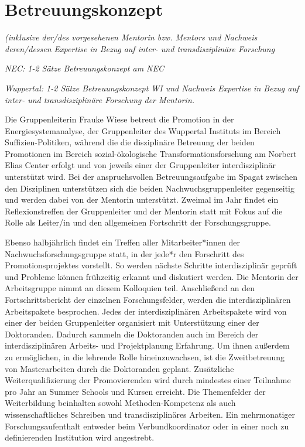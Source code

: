 \documentclass[a4paper,11pt,twoside]{scrartcl}
\begin{document}
\section{Betreuungskonzept}
\textit{(inklusive der/des vorgesehenen Mentorin bzw. Mentors und Nachweis deren/dessen Expertise in Bezug auf inter- und transdisziplinäre Forschung}

\textit{NEC: 1-2 Sätze Betreuungskonzept am NEC}

\textit{Wuppertal: 1-2 Sätze Betreuungskonzept WI und Nachweis Expertise in Bezug auf inter- und transdisziplinäre Forschung der Mentorin.}

Die Gruppenleiterin Frauke Wiese betreut die Promotion in der Energiesystemanalyse, der Gruppenleiter des Wuppertal Instituts im Bereich Suffizien-Politiken, während die die disziplinäre Betreuung der beiden Promotionen im Bereich sozial-ökologische Transformationsforschung am Norbert Elias Center erfolgt und von jeweils einer der Gruppenleiter interdisziplinär unterstützt wird. Bei der anspruchsvollen Betreuungsaufgabe im Spagat zwischen den Disziplinen unterstützen sich die beiden Nachwuchsgruppenleiter gegenseitig und werden dabei von der Mentorin unterstützt. Zweimal im Jahr findet ein Reflexionstreffen der Gruppenleiter und der Mentorin statt mit Fokus auf die Rolle als Leiter/in und den allgemeinen Fortschritt der Forschungsgruppe. 

Ebenso halbjährlich findet ein Treffen aller Mitarbeiter*innen der Nachwuchsforschungsgruppe statt, in der jede*r den Forschritt des Promotionsprojektes vorstellt. So werden nächste Schritte interdisziplinär geprüft und Probleme können frühzeitig erkannt und diskutiert werden. Die Mentorin der Arbeitsgruppe nimmt an diesem Kolloquien teil. Anschließend an den Fortschrittsbericht der einzelnen Forschungsfelder, werden die interdisziplinären Arbeitspakete besprochen. Jedes der interdisziplinären Arbeitspakete wird von einer der beiden Gruppenleiter organisiert mit Unterstützung einer der Doktoranden. Dadurch sammeln die Doktoranden auch im Bereich der interdisziplinären Arbeits- und Projektplanung Erfahrung. Um ihnen außerdem zu ermöglichen, in die lehrende Rolle hineinzuwachsen, ist die Zweitbetreuung von Masterarbeiten durch die Doktoranden geplant. Zusätzliche Weiterqualifizierung der Promovierenden wird durch mindestes einer Teilnahme pro Jahr an Summer Schools und Kursen erreicht. Die Themenfelder der Weiterbildung beinhalten sowohl Methoden-Kompetenz als auch wissenschaftliches Schreiben und transdisziplinäres Arbeiten. Ein mehrmonatiger Forschungsaufenthalt entweder beim Verbundkoordinator oder in einer noch zu definierenden Institution wird angestrebt.
\end{document}
